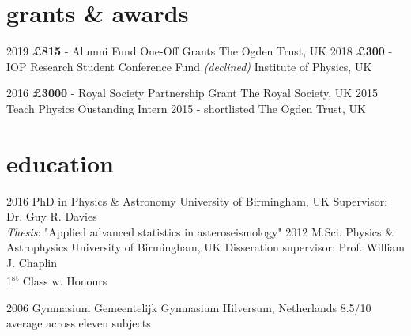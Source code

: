 \documentclass[]{k-cv} %
\begin{document}
\section{grants \& awards}

\begin{entrylist}
	\entrythree
	{2019}
	{\textbf{\pounds 815} - Alumni Fund One-Off Grants}
	{The Ogden Trust, UK}
	\entrythree
	{2018}
	{\textbf{\pounds 300} - IOP Research Student Conference Fund \emph{(declined)}}
	{Institute of Physics, UK}
	
	\entrythree
	{2016}
	{\textbf{\pounds 3000} - Royal Society Partnership Grant}
	{The Royal Society, UK}
	\entrythree
	{2015}
	{Teach Physics Oustanding Intern 2015 - shortlisted}
	{The Ogden Trust, UK}
	
\end{entrylist}

\clearpage
{}


\section{education}

\begin{entrylist}
\centry
{2016 }
{PhD {\normalfont in Physics \& Astronomy}}
{University of Birmingham, UK}
{Supervisor: Dr. Guy R. Davies\\
\textit{Thesis}: "Applied advanced statistics in asteroseismology"} 
\centry
{2012 }
{M.Sci. {\normalfont Physics \& Astrophysics}}
{University of Birmingham, UK}
{Disseration supervisor: Prof. William J. Chaplin\\
1\textsuperscript{st} Class w. Honours}



\centry
{2006 }
{Gymnasium}
{Gemeentelijk Gymnasium Hilversum, Netherlands}
{8.5/10 average across eleven subjects}
\end{entrylist}
\end{document}

